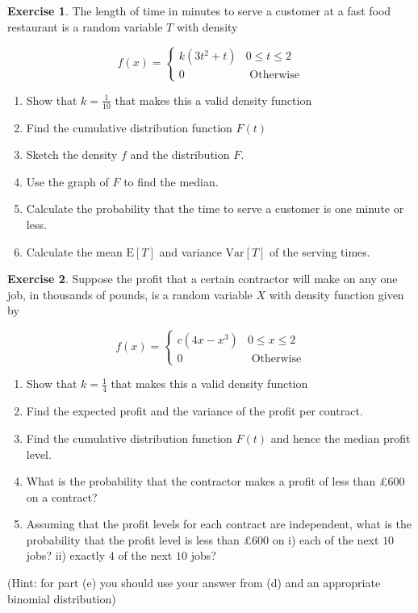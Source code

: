 \documentclass[
]{book}
\theoremstyle{definition}
\theoremstyle{definition}
\theoremstyle{definition}
\newtheorem{exercise}{Exercise}[chapter]
\theoremstyle{definition}
\theoremstyle{remark}
\begin{document}
\begin{exercise}

The length of time in minutes to serve a customer at a fast food restaurant is a random variable \(T\) with density

\begin{equation*}
  f(x)=\begin{cases}
        k(3t^2 + t) & 0 \leq t \leq 2 \\
        0 &  \text{     Otherwise}
  \end{cases}
\end{equation*}

\begin{enumerate}
\def\labelenumi{\alph{enumi})}
\item
  Show that \(k = \frac{1}{10}\) that makes this a valid density function
\item
  Find the cumulative distribution function \(F(t)\)
\item
  Sketch the density \(f\) and the distribution \(F\).
\item
  Use the graph of \(F\) to find the median.
\item
  Calculate the probability that the time to serve a customer is one minute or less.
\item
  Calculate the mean \(\text{E}[T]\) and variance \(\text{Var}[T]\) of the serving times.
\end{enumerate}

\end{exercise}

\begin{exercise}
Suppose the profit that a certain contractor will make on any one job, in thousands of pounds, is a random variable \(X\) with density function given by

\begin{equation*}
  f(x)=\begin{cases}
        c(4x -x^3) & 0 \leq x \leq 2 \\
        0 &  \text{     Otherwise}
  \end{cases}
\end{equation*}

\begin{enumerate}
\def\labelenumi{\alph{enumi})}
\item
  Show that \(k =\frac{1}{4}\) that makes this a valid density function
\item
  Find the expected profit and the variance of the profit per contract.
\item
  Find the cumulative distribution function \(F(t)\) and hence the median profit level.
\item
  What is the probability that the contractor makes a profit of less than £\(600\) on a contract?
\item
  Assuming that the profit levels for each contract are independent, what is the probability that the profit level is less than £\(600\) on
  i) each of the next \(10\) jobs?
  ii) exactly \(4\) of the next \(10\) jobs?
\end{enumerate}

(Hint: for part (e) you should use your answer from (d) and an appropriate binomial distribution)
\end{exercise}
\end{document}
